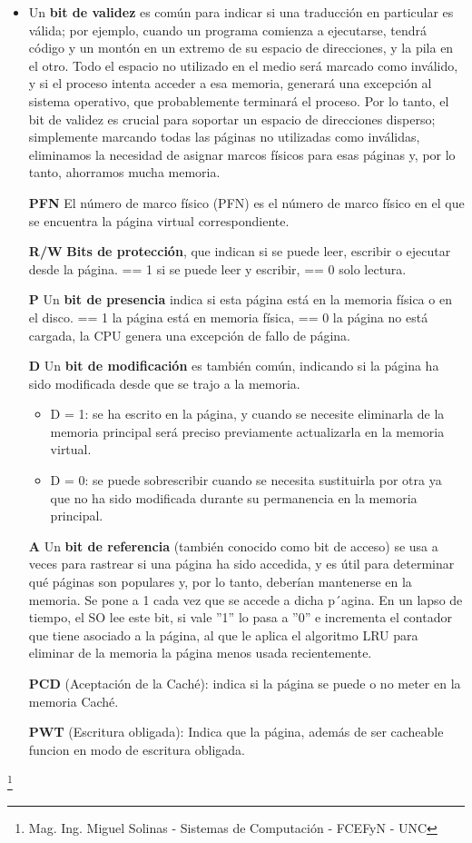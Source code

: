 \documentclass{article}
\begin{document}
\begin{itemize}
    \item Un \textbf{bit de validez} es común para indicar si una traducción en particular es válida; por ejemplo, cuando un programa comienza a ejecutarse, tendrá código y un montón en un extremo de su espacio de direcciones, y la pila en el otro. Todo el espacio no utilizado en el medio será marcado como inválido, y si el proceso intenta acceder a esa memoria, generará una excepción al sistema operativo, que probablemente terminará el proceso. Por lo tanto, el bit de validez es crucial para soportar un espacio de direcciones disperso; simplemente marcando todas las páginas no utilizadas como inválidas, eliminamos la necesidad de asignar marcos físicos para esas páginas y, por lo tanto, ahorramos mucha memoria.
    \item[\textbf{PFN}] El número de marco físico (PFN) es el número de marco físico en el que se encuentra la página virtual correspondiente.
    \item[\textbf{R/W}] \textbf{Bits de protección}, que indican si se puede leer, escribir o ejecutar desde la página. == 1 si se puede leer y escribir, == 0 solo lectura.
    \item[\textbf{P}] Un \textbf{bit de presencia} indica si esta página está en la memoria física o en el disco. == 1 la página está en memoria física, == 0 la página no está cargada, la CPU genera una excepción de fallo de página.
    \item[\textbf{D}] Un \textbf{bit de modificación} es también común, indicando si la página ha sido modificada desde que se trajo a la memoria.
    \begin{itemize}
        \item D = 1: se ha escrito en la página, y cuando se necesite eliminarla de la memoria principal será preciso previamente actualizarla en la memoria virtual.
        \item D = 0: se puede sobrescribir cuando se necesita sustituirla por otra ya que no ha sido modificada durante su permanencia en la memoria principal.
    \end{itemize}
    \item[\textbf{A}] Un \textbf{bit de referencia} (también conocido como bit de acceso) se usa a veces para rastrear si una página ha sido accedida, y es útil para determinar qué páginas son populares y, por lo tanto, deberían mantenerse en la memoria. Se pone a 1 cada vez que se accede a dicha p´agina. En un lapso de tiempo, el SO lee este bit, si vale ”1” lo pasa a ”0” e incrementa el contador que tiene asociado a la página, al que le aplica el algoritmo LRU para eliminar de la memoria la página menos usada recientemente.
    \item[\textbf{PCD}] (Aceptación de la Caché): indica si la página se puede o no meter en la memoria Caché.
    \item[\textbf{PWT}] (Escritura obligada): Indica que la página, además de ser cacheable funcion en modo de escritura obligada.
\end{itemize} \footnote{Mag. Ing. Miguel Solinas - Sistemas de Computación - FCEFyN - UNC}
\end{document}
